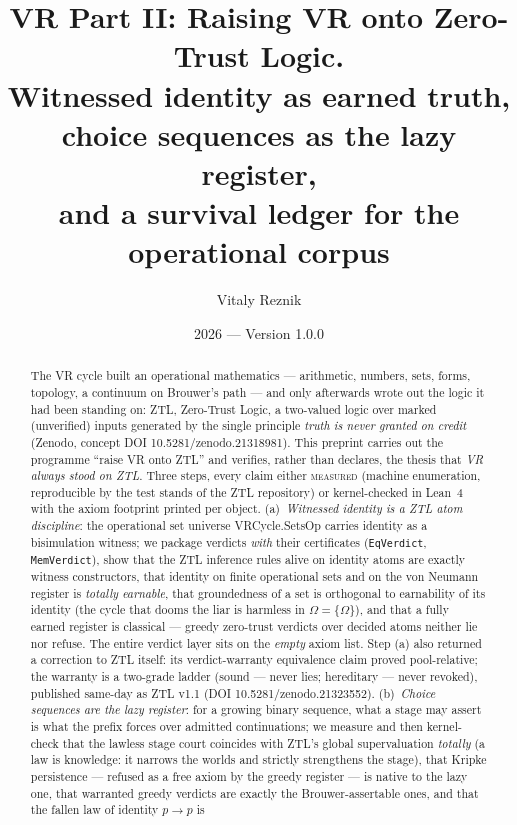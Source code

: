 \documentclass[11pt]{article}
\title{\textbf{VR Part II: Raising VR onto Zero-Trust Logic.}\\[2pt]
\large Witnessed identity as earned truth, choice sequences as the lazy
register,\\ and a survival ledger for the operational corpus}
\author{Vitaly Reznik}
\date{2026 --- Version 1.0.0}
\theoremstyle{remark}
\newcommand{\MEASURED}{\textsc{measured}}
\begin{document}
\maketitle

\begin{abstract}
The VR cycle built an operational mathematics --- arithmetic, numbers, sets,
forms, topology, a continuum on Brouwer's path --- and only afterwards wrote
out the logic it had been standing on: ZTL, Zero-Trust Logic, a two-valued
logic over marked (unverified) inputs generated by the single principle
\emph{truth is never granted on credit} (Zenodo, concept DOI
10.5281/zenodo.21318981). This preprint carries out the programme ``raise VR
onto ZTL'' and verifies, rather than declares, the thesis that \emph{VR
always stood on ZTL}. Three steps, every claim either \MEASURED{} (machine
enumeration, reproducible by the test stands of the ZTL repository) or
kernel-checked in Lean~4 with the axiom footprint printed per object.
(a)~\emph{Witnessed identity is a ZTL atom discipline}: the operational
set universe \textsf{VRCycle.SetsOp} carries identity as a bisimulation
witness; we package verdicts \emph{with} their certificates
(\texttt{EqVerdict}, \texttt{MemVerdict}), show that the ZTL inference rules
alive on identity atoms are exactly witness constructors, that identity on
finite operational sets and on the von Neumann register is \emph{totally
earnable}, that groundedness of a set is orthogonal to earnability of its
identity (the cycle that dooms the liar is harmless in $\Omega=\{\Omega\}$),
and that a fully earned register is classical --- greedy zero-trust verdicts
over decided atoms neither lie nor refuse. The entire verdict layer sits on
the \emph{empty} axiom list. Step (a) also returned a correction to ZTL
itself: its verdict-warranty equivalence claim proved pool-relative; the
warranty is a two-grade ladder (sound --- never lies; hereditary --- never
revoked), published same-day as ZTL v1.1 (DOI 10.5281/zenodo.21323552).
(b)~\emph{Choice sequences are the lazy register}: for a growing binary
sequence, what a stage may assert is what the prefix forces over admitted
continuations; we measure and then kernel-check that the lawless stage court
coincides with ZTL's global supervaluation \emph{totally} (a law is
knowledge: it narrows the worlds and strictly strengthens the stage), that
Kripke persistence --- refused as a free axiom by the greedy register --- is
native to the lazy one, that warranted greedy verdicts are exactly the
Brouwer-assertable ones, and that the fallen law of identity $p\to p$ is

\end{abstract}
\end{document}
